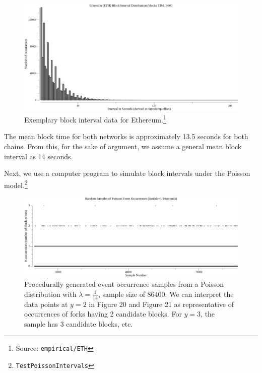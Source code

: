 \documentclass[11pt]{article}
\begin{document}
	\begin{figure}[tph!]
		\centering
		\includegraphics[width=1.0\textwidth]{vis_data_blockinterval_distribution_ETH.png}
		\caption{
			Exemplary block interval data for Ethereum.\footnote{Source: \texttt{empirical/ETH}}
		}
	\end{figure}

	\clearpage

	The mean block time for both networks is approximately 13.5 seconds for both chains.
	From this, for the sake of argument, we assume a general mean block interval as 14 seconds.

	Next, we use a computer program to simulate block intervals under the Poisson
	model.\footnote{\texttt{TestPoissonIntervals}}

	\begin{figure}[tph!]
		\label{vis_poisson_samples_events_86400}
		\centering
		\includegraphics[width=1.0\textwidth]{go-block-step/out/vis_poisson_samples_events_86400.png}
		\caption{
			Procedurally generated event occurrence samples from a Poisson distribution
			with $\lambda = \frac{1}{14}$, sample size of 86400.
			We can interpret the data points at $y=2$ in Figure 20 and Figure 21 as
			representative of occurrences of forks having 2 candidate blocks.
			For $y=3$, the sample has 3 candidate blocks, etc.
		}
	\end{figure}
\end{document}
